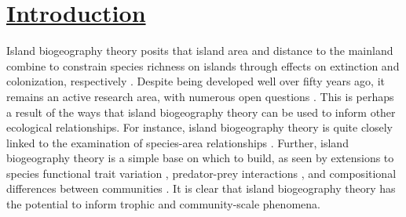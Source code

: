 \section*{\textbf{\underline{Introduction}}}
Island biogeography theory posits that island area and distance to the mainland combine to constrain species richness on islands through effects on extinction and colonization, respectively \parencite{macarthur2001}. Despite being developed well over fifty years ago, it remains an active research area, with numerous open questions \parencite{patino2017}. This is perhaps a result of the ways that island biogeography theory can be used to inform other ecological relationships. For instance, island biogeography theory is quite closely linked to the examination of species-area relationships \parencite{losos2000, peay2007}. Further, island biogeography theory is a simple base on which to build, as seen by extensions to species functional trait variation \parencite{jacquet2017}, predator-prey interactions \parencite{gravel2011}, and compositional differences between communities \parencite{lu2018}. It is clear that island biogeography theory has the potential to inform trophic and community-scale phenomena. 
